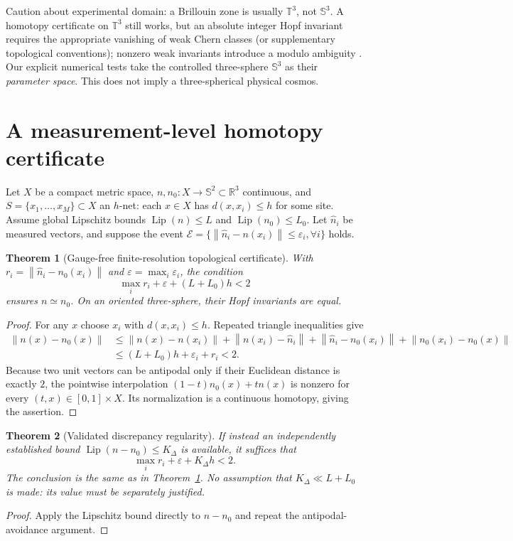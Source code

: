 \documentclass[aps,prd,onecolumn,notitlepage,11pt,superscriptaddress,longbibliography]{revtex4-2}
\newtheorem{theorem}{Theorem}
\newcommand{\Sph}{\mathbb S}
\newcommand{\norm}[1]{\left\lVert#1\right\rVert}
\begin{document}
Caution about experimental domain: a Brillouin zone is usually $\mathbb T^3$, not $\Sph^3$. A homotopy certificate on $\mathbb T^3$ still works, but an absolute integer Hopf invariant requires the appropriate vanishing of weak Chern classes (or supplementary topological conventions); nonzero weak invariants introduce a modulo ambiguity \cite{Jankowski2024}. Our explicit numerical tests take the controlled three-sphere $\Sph^3$ as their \emph{parameter space}. This does not imply a three-spherical physical cosmos.

\section{A measurement-level homotopy certificate}
Let $X$ be a compact metric space, $n,n_0:X\to\Sph^2\subset\mathbb R^3$ continuous, and $S=\{x_1,\ldots,x_M\}\subset X$ an $h$-net: each $x\in X$ has $d(x,x_i)\le h$ for some site. Assume global Lipschitz bounds $\operatorname{Lip}(n)\le L$ and $\operatorname{Lip}(n_0)\le L_0$. Let $\widehat n_i$ be measured vectors, and suppose the event $\mathcal E=\{\norm{\widehat n_i-n(x_i)}\le\varepsilon_i,\forall i\}$ holds.

\begin{theorem}[Gauge-free finite-resolution topological certificate]\label{th:generic}
With $r_i=\norm{\widehat n_i-n_0(x_i)}$ and $\varepsilon=\max_i\varepsilon_i$, the condition
\begin{equation}\label{eq:generic}
\boxed{\max_i r_i+\varepsilon+(L+L_0)h<2}
\end{equation}
ensures $n\simeq n_0$. On an oriented three-sphere, their Hopf invariants are equal.
\end{theorem}
\begin{proof}
For any $x$ choose $x_i$ with $d(x,x_i)\le h$. Repeated triangle inequalities give
\begin{align}
\norm{n(x)-n_0(x)}&\le\norm{n(x)-n(x_i)}+\norm{n(x_i)-\widehat n_i}+\norm{\widehat n_i-n_0(x_i)}+\norm{n_0(x_i)-n_0(x)}\\
&\le (L+L_0)h+\varepsilon_i+r_i<2.
\end{align}
Because two unit vectors can be antipodal only if their Euclidean distance is exactly $2$, the pointwise interpolation $(1-t)n_0(x)+tn(x)$ is nonzero for every $(t,x)\in[0,1]\times X$. Its normalization is a continuous homotopy, giving the assertion.
\end{proof}

\begin{theorem}[Validated discrepancy regularity]\label{th:res}
If instead an independently established bound $\operatorname{Lip}(n-n_0)\le K_\Delta$ is available, it suffices that
\begin{equation}\label{eq:res}
\boxed{\max_i r_i+\varepsilon+K_\Delta h<2.}
\end{equation}
The conclusion is the same as in Theorem~\ref{th:generic}. No assumption that $K_\Delta\ll L+L_0$ is made: its value must be \emph{separately justified}.
\end{theorem}
\begin{proof}
Apply the Lipschitz bound directly to $n-n_0$ and repeat the antipodal-avoidance argument.
\end{proof}
\end{document}
